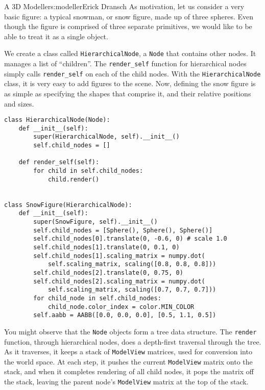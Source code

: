 \begin{aosachapter}{A 3D Modeller}{s:modeller}{Erick Dransch}
As motivation, let us consider a very basic figure: a typical snowman,
or snow figure, made up of three spheres. Even though the figure is
comprised of three separate primitives, we would like to be able to
treat it as a single object.

We create a class called \texttt{HierarchicalNode}, a \texttt{Node} that
contains other nodes. It manages a list of ``children''. The
\texttt{render\_self} function for hierarchical nodes simply calls
\texttt{render\_self} on each of the child nodes. With the
\texttt{HierarchicalNode} class, it is very easy to add figures to the
scene. Now, defining the snow figure is as simple as specifying the
shapes that comprise it, and their relative positions and sizes.


\begin{verbatim}
class HierarchicalNode(Node):
    def __init__(self):
        super(HierarchicalNode, self).__init__()
        self.child_nodes = []

    def render_self(self):
        for child in self.child_nodes:
            child.render()


class SnowFigure(HierarchicalNode):
    def __init__(self):
        super(SnowFigure, self).__init__()
        self.child_nodes = [Sphere(), Sphere(), Sphere()]
        self.child_nodes[0].translate(0, -0.6, 0) # scale 1.0
        self.child_nodes[1].translate(0, 0.1, 0)
        self.child_nodes[1].scaling_matrix = numpy.dot(
            self.scaling_matrix, scaling([0.8, 0.8, 0.8]))
        self.child_nodes[2].translate(0, 0.75, 0)
        self.child_nodes[2].scaling_matrix = numpy.dot(
            self.scaling_matrix, scaling([0.7, 0.7, 0.7]))
        for child_node in self.child_nodes:
            child_node.color_index = color.MIN_COLOR
        self.aabb = AABB([0.0, 0.0, 0.0], [0.5, 1.1, 0.5])
\end{verbatim}

You might observe that the \texttt{Node} objects form a tree data
structure. The \texttt{render} function, through hierarchical nodes,
does a depth-first traversal through the tree. As it traverses, it keeps
a stack of \texttt{ModelView} matrices, used for conversion into the
world space. At each step, it pushes the current \texttt{ModelView}
matrix onto the stack, and when it completes rendering of all child
nodes, it pops the matrix off the stack, leaving the parent node's
\texttt{ModelView} matrix at the top of the stack.


\end{aosachapter}
